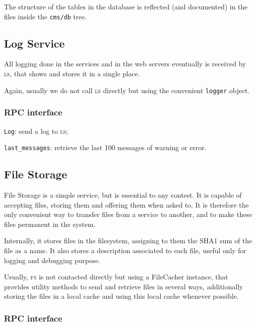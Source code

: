 \documentclass[a4paper,8pt]{amsart}
\newcommand{\LS}{\textsc{ls}}
\newcommand{\FS}{\textsc{fs}}
\newenvironment{squishlist}{%
  \begin{list}{\textbullet}%
    { \setlength{\itemsep}{0pt}%
      \setlength{\parsep}{3pt}%
      \setlength{\topsep}{3pt}%
      \setlength{\partopsep}{0pt}%
      \setlength{\leftmargin}{1.5em}%
      \setlength{\labelwidth}{1em}%
      \setlength{\labelsep}{0.5em} }%
}{\end{list}}
\newcommand{\id}[1]{\texttt{#1}}
\newcommand{\file}[1]{\texttt{#1}}
\begin{document}
\begin{multicols}{2}
  The structure of the tables in the database is reflected (and
  documented) in the files inside the \file{cms/db} tree.

  \subsection{Log Service}

  All logging done in the services and in the web servers eventually
  is received by \LS{}, that shows and stores it in a single place.

  Again, usually we do not call \LS{} directly but using the
  convenient \id{logger} object.

  \subsubsection{RPC interface}

  \begin{squishlist}
  \item \id{Log}: send a log to \LS{};
  \item \id{last\_messages}: retrieve the last 100 messages of warning
    or error.
  \end{squishlist}

  \subsection{File Storage}

  File Storage is a simple service, but is essential to any
  contest. It is capable of accepting files, storing them and offering
  them when asked to. It is therefore the only convenient way to
  transfer files from a service to another, and to make these files
  permanent in the system.

  Internally, it stores files in the filesystem, assigning to them the
  SHA1 sum of the file as a name. It also stores a description
  associated to each file, useful only for logging and debugging
  purpose.

  Usually, \FS{} is not contacted directly but using a FileCacher
  instance, that provides utility methods to send and retrieve files
  in several ways, additionally storing the files in a local cache and
  using this local cache whenever possible.

  \subsubsection{RPC interface}


\end{multicols}
\end{document}
